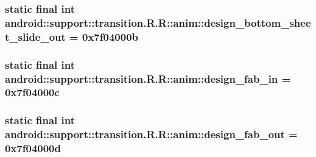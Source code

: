 \hypertarget{classandroid_1_1support_1_1transition_1_1_r_1_1anim_92d5d89831ed9a32b226a5209991b2d9}{
\subsubsection[{design\_\-bottom\_\-sheet\_\-slide\_\-out}]{\setlength{\rightskip}{0pt plus 5cm}static final int android::support::transition.R.R::anim::design\_\-bottom\_\-sheet\_\-slide\_\-out = 0x7f04000b}}
\label{classandroid_1_1support_1_1transition_1_1_r_1_1anim_92d5d89831ed9a32b226a5209991b2d9}


\hypertarget{classandroid_1_1support_1_1transition_1_1_r_1_1anim_64b0af6eb65af266956dc4a39224c335}{
\subsubsection[{design\_\-fab\_\-in}]{\setlength{\rightskip}{0pt plus 5cm}static final int android::support::transition.R.R::anim::design\_\-fab\_\-in = 0x7f04000c}}
\label{classandroid_1_1support_1_1transition_1_1_r_1_1anim_64b0af6eb65af266956dc4a39224c335}


\hypertarget{classandroid_1_1support_1_1transition_1_1_r_1_1anim_15f44bf77bfeb81268d44777bd2e41d1}{
\subsubsection[{design\_\-fab\_\-out}]{\setlength{\rightskip}{0pt plus 5cm}static final int android::support::transition.R.R::anim::design\_\-fab\_\-out = 0x7f04000d}}
\label{classandroid_1_1support_1_1transition_1_1_r_1_1anim_15f44bf77bfeb81268d44777bd2e41d1}


